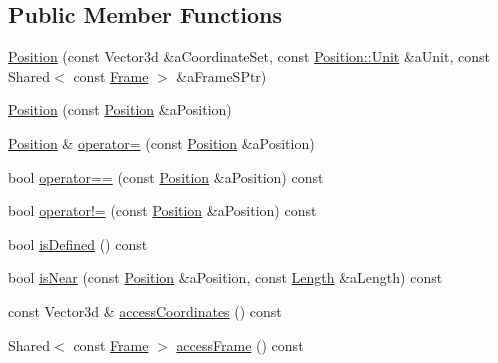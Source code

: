 \subsection*{Public Member Functions}
\begin{DoxyCompactItemize}
\item 
\hyperlink{classlibrary_1_1physics_1_1coord_1_1_position_ac69f2ea85b82a43db1793f7e9cb183f8}{Position} (const Vector3d \&a\+Coordinate\+Set, const \hyperlink{classlibrary_1_1physics_1_1units_1_1_length_a3b8b39cd245cf6b19dc34459baeccb18}{Position\+::\+Unit} \&a\+Unit, const Shared$<$ const \hyperlink{classlibrary_1_1physics_1_1coord_1_1_frame}{Frame} $>$ \&a\+Frame\+S\+Ptr)
\item 
\hyperlink{classlibrary_1_1physics_1_1coord_1_1_position_a8916e7e373ca3f2bd44d7b41b7f2c2aa}{Position} (const \hyperlink{classlibrary_1_1physics_1_1coord_1_1_position}{Position} \&a\+Position)
\item 
\hyperlink{classlibrary_1_1physics_1_1coord_1_1_position}{Position} \& \hyperlink{classlibrary_1_1physics_1_1coord_1_1_position_af09db5e8cedf8a643ad8fc7632a8826f}{operator=} (const \hyperlink{classlibrary_1_1physics_1_1coord_1_1_position}{Position} \&a\+Position)
\item 
bool \hyperlink{classlibrary_1_1physics_1_1coord_1_1_position_a520bfdf64e8f45f60e815ebc72012fde}{operator==} (const \hyperlink{classlibrary_1_1physics_1_1coord_1_1_position}{Position} \&a\+Position) const
\item 
bool \hyperlink{classlibrary_1_1physics_1_1coord_1_1_position_a78524e4b9328853ca6266defbe61fc7e}{operator!=} (const \hyperlink{classlibrary_1_1physics_1_1coord_1_1_position}{Position} \&a\+Position) const
\item 
bool \hyperlink{classlibrary_1_1physics_1_1coord_1_1_position_ac13492ffe13b093bb26173089db1a24b}{is\+Defined} () const
\item 
bool \hyperlink{classlibrary_1_1physics_1_1coord_1_1_position_a1fafd3a66e10d748f5a27e13d482acea}{is\+Near} (const \hyperlink{classlibrary_1_1physics_1_1coord_1_1_position}{Position} \&a\+Position, const \hyperlink{classlibrary_1_1physics_1_1units_1_1_length}{Length} \&a\+Length) const
\item 
const Vector3d \& \hyperlink{classlibrary_1_1physics_1_1coord_1_1_position_abbcef57299f3416b88c458ea6bcd24e5}{access\+Coordinates} () const
\item 
Shared$<$ const \hyperlink{classlibrary_1_1physics_1_1coord_1_1_frame}{Frame} $>$ \hyperlink{classlibrary_1_1physics_1_1coord_1_1_position_a26c1f0eba51a3441106367eac1827455}{access\+Frame} () const

\end{DoxyCompactItemize}

